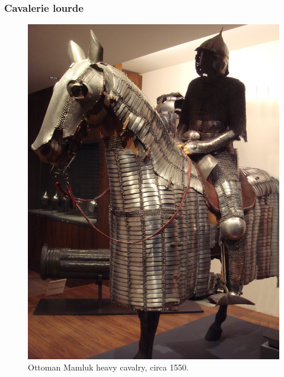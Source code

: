 \documentclass{article}
\begin{document}
\subsubsection{Cavalerie lourde}
\begin{figure}[H]
	\begin{centering}
	\includegraphics[width=0.44\paperwidth]{../ressources/Ottoman_Mamluk_horseman}
	\caption{Ottoman Mamluk heavy cavalry, circa 1550. \cite{heavy_cavalry}}
	\end{centering}
\end{figure}
\end{document}
